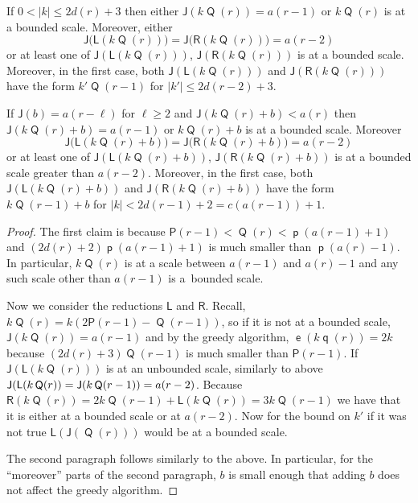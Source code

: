 \documentclass[AHL,Unicode,longabstracts,published]{cedram}
\DeclareMathOperator{\lst}{\mathsf{e}}
\DeclareMathOperator{\p}{\mathsf{p}}
\DeclareMathOperator{\q}{\mathsf{q}}
\DeclareMathOperator{\Q}{\mathsf{Q}}
\newcommand{\lft}{\mathsf{L}}
\newcommand{\rht}{\mathsf{R}}
\renewcommand{\P}{\mathsf{P}}
\newcommand{\scl}{\mathsf{J}}
\begin{document}
\begin{lemm}\label{lem:for pairing}
If $0<|k|\leq 2d(r)+3$ then either $\scl(k\Q(r))=a(r-1)$ or $k\Q(r)$ is at a bounded scale. Moreover, either
\[
\scl \bigl(\lft(k\Q(r))\bigr) =
\scl \bigl(\rht(k\Q(r))\bigr) = a(r-2)
\]
or at least one of $\scl(\lft(k\Q(r)))$, $\scl(\rht(k\Q(r)))$ is at a bounded scale. Moreover, in the first case, both $\scl(\lft(k\Q(r)))$ and $\scl(\rht(k\Q(r)))$ have the form $k'\Q(r-1)$ for $|k'|\leq 2d(r-2)+3$.

If $\scl(b)=a(r-\ell)$ for $\ell \geq 2$ and $\scl(k \Q(r)+b)<a(r)$ then $\scl(k\Q(r)+b)=a(r-1)$ or $k \Q(r)+b$ is at a bounded scale. Moreover
\[
\scl\bigl(\lft(k\Q(r)+b)\bigr) = \scl\bigl(\rht(k\Q(r)+b)\bigr) = a(r-2)
\]
or at least one of $\scl(\lft(k\Q(r)+b))$, $\scl(\rht(k\Q(r)+b))$ is at a bounded scale greater than $a(r-2)$. Moreover, in the first case, both $\scl(\lft(k\Q(r)+b))$ and $\scl(\rht(k\Q(r)+b))$ have the form $k\Q(r-1)+b$ for $|k|<2d(r-1)+2=c(a(r-1))+1$.
\end{lemm}
\begin{proof}
The first claim is because $\P(r-1)<\Q(r)< \p(a(r-1)+1)$ and $(2d(r)+2)\p(a(r-1)+1)$ is much smaller than $\p(a(r)-1)$. In particular, $k\Q(r)$ is at a scale between $a(r-1)$ and $a(r)-1$ and any such scale other than $a(r-1)$ is a~bounded scale.

Now we consider the reductions $\lft$ and $\rht$. Recall, $k\Q(r)=k(2\P(r-1)-\Q(r-1))$, so if it is not at a bounded scale, $\scl(k\Q(r))=a(r-1)$ and by the greedy algorithm, $\lst(k\q(r))=2k$ because $(2d(r)+3)\Q(r-1)$ is much smaller than $\P(r-1)$. If $\scl(\lft(k\Q(r)))$ is at an unbounded scale, similarly to above $\scl(\lft(k\Q(r)) = \scl(k\Q(r-1))\linebreak = a(r-2)$. Because $\rht(k\Q(r))=2k\Q(r-1)+\lft(k\Q(r))=3k\Q(r-1)$ we have that it is either at a bounded scale or at $a(r-2)$. Now for the bound on $k'$ if it was not true $\lft(\scl(\Q(r)))$ would be at a bounded scale.

The second paragraph follows similarly to the above. In particular, for the ``moreover'' parts of the second paragraph, $b$ is small enough that adding $b$ does not affect the greedy algorithm.
\end{proof}
\end{document}
